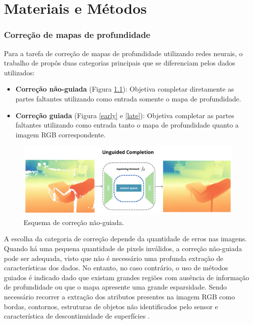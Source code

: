 
\chapter{Materiais e Métodos}

\subsection{Correção de mapas de profundidade} 

Para a tarefa de correção de mapas de profundidade utilizando redes neurais, o trabalho de \cite{hu2022deep} propôs duas categorias principais que se diferenciam pelos dados utilizados:

\begin{itemize}
    \item \textbf{Correção não-guiada} (Figura \ref{ung}): Objetiva completar diretamente as partes faltantes utilizando como entrada somente o mapa de profundidade.
    \item \textbf{Correção guiada} (Figura \ref{early} e \ref{late}): Objetiva completar as partes faltantes utilizando como entrada tanto o mapa de profundidade quanto a imagem RGB correspondente.
\end{itemize}

\begin{figure}[h]
    \centering
    \includegraphics[width=\textwidth]{fig/unguided.png}
    \caption{Esquema de correção não-guiada.}
    \label{ung}
\end{figure}

A escolha da categoria de correção depende da quantidade de erros nas imagens. Quando há uma pequena quantidade de pixels inválidos, a correção não-guiada pode ser adequada, visto que não é necessário uma profunda extração de características dos dados. No entanto, no caso contrário, o uso de métodos guiados é indicado dado que existam grandes regiões com ausência de informação de profundidade ou que o mapa apresente uma grande esparsidade. Sendo necessário recorrer a extração dos atributos presentes na imagem RGB como bordas, contornos, estruturas de objetos não identificados pelo sensor e característica de descontinuidade de superfícies \cite{hu2022deep}.

